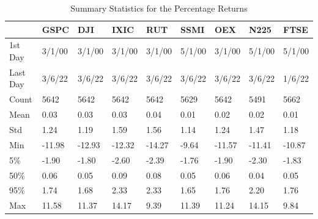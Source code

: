 \documentclass[a4paper, oneside]{discothesis}
\begin{document}
\begin{table}[!ht] \label{tab:summary_1d}
    \centering
    \scriptsize
    \begin{tabular}{|p{1.2cm}||p{}|p{}|p{}|p{}|p{}|p{}|p{}|p{}|}
    \hline
        ~ & GSPC & DJI & IXIC & RUT & SSMI & OEX & N225 & FTSE \\ \hline\hline
        1st Day & 3/1/00 & 3/1/00 & 3/1/00 & 3/1/00 & 5/1/00 & 3/1/00 & 5/1/00 & 5/1/00 \\ \hline
        Last Day & 3/6/22 & 3/6/22 & 3/6/22 & 3/6/22 & 3/6/22 & 3/6/22 & 3/6/22 & 1/6/22 \\ \hline
        Count & 5642 & 5642 & 5642 & 5642 & 5629 & 5642 & 5491 & 5662 \\ \hline
        Mean & 0.03 & 0.03 & 0.03 & 0.04 & 0.01 & 0.02 & 0.02 & 0.01 \\ \hline
        Std & 1.24 & 1.19 & 1.59 & 1.56 & 1.14 & 1.24 & 1.47 & 1.18 \\ \hline
        Min & -11.98 & -12.93 & -12.32 & -14.27 & -9.64 & -11.57 & -11.41 & -10.87 \\ \hline
        5\%  & -1.90 & -1.80 & -2.60 & -2.39 & -1.76 & -1.90 & -2.30 & -1.83 \\ \hline
        50\%  & 0.06 & 0.05 & 0.09 & 0.08 & 0.05 & 0.06 & 0.04 & 0.05 \\ \hline
        95\%  & 1.74 & 1.68 & 2.33 & 2.33 & 1.65 & 1.76 & 2.20 & 1.76 \\ \hline
        Max & 11.58 & 11.37 & 14.17 & 9.39 & 11.39 & 11.24 & 14.15 & 9.84 \\ \hline
    \end{tabular}
    \normalsize
    \caption{Summary Statistics for the Percentage Returns}
\end{table}
\end{document}

